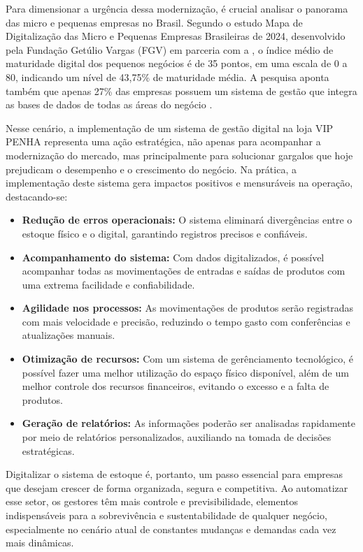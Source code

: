 \documentclass[
	12pt,				%
	openany,			%
	twoside,			%
	a4paper,			%
	english,			%
	brazil				%
	]{abntex2}
\begin{document}
Para dimensionar a urgência dessa modernização, é crucial analisar o panorama das micro e pequenas empresas no Brasil. Segundo o estudo Mapa de Digitalização das Micro e Pequenas Empresas Brasileiras de 2024, desenvolvido pela Fundação Getúlio Vargas (FGV) em parceria com a  , o índice médio de maturidade digital dos pequenos negócios é de 35 pontos, em uma escala de 0 a 80, indicando um nível de 43,75\% de maturidade média. A pesquisa aponta também que apenas 27\% das empresas possuem um sistema de gestão que integra as bases de dados de todas as áreas do negócio . 

Nesse cenário, a implementação de um sistema de gestão digital na loja VIP PENHA representa uma ação estratégica, não apenas para acompanhar a modernização do mercado, mas principalmente para solucionar gargalos que hoje prejudicam o desempenho e o crescimento do negócio. Na prática, a implementação deste sistema gera impactos positivos e mensuráveis na operação, destacando-se:

\begin{itemize}
    \item \textbf{Redução de erros operacionais:} O sistema eliminará divergências entre o estoque físico e o digital, garantindo registros precisos e confiáveis.
    \item \textbf{Acompanhamento do sistema:} Com dados digitalizados, é possível acompanhar todas as movimentações de entradas e saídas de produtos com uma extrema facilidade e confiabilidade.
    \item \textbf{Agilidade nos processos:} As movimentações de produtos serão registradas com mais velocidade e precisão, reduzindo o tempo gasto com conferências e atualizações manuais.
    \item \textbf{Otimização de recursos:} Com um sistema de gerênciamento tecnológico, é possível fazer uma melhor utilização do espaço físico disponível, além de um melhor controle dos recursos financeiros, evitando o excesso e a falta de produtos.
    \item \textbf{Geração de relatórios:} As informações poderão ser analisadas rapidamente por meio de relatórios personalizados, auxiliando na tomada de decisões estratégicas.
\end{itemize}

Digitalizar o sistema de estoque é, portanto, um passo essencial para empresas que desejam crescer de forma organizada, segura e competitiva. Ao automatizar esse setor, os gestores têm mais controle e previsibilidade, elementos indispensáveis para a sobrevivência e sustentabilidade de qualquer negócio, especialmente no cenário atual de constantes mudanças e demandas cada vez mais dinâmicas.
\end{document}

